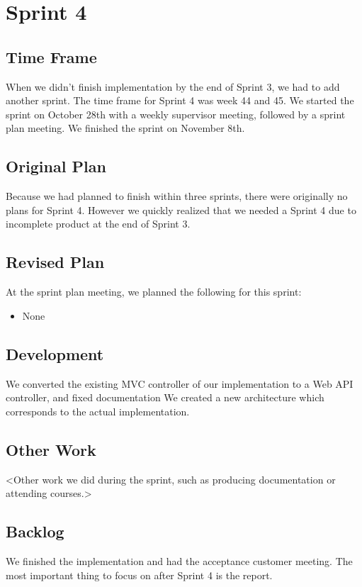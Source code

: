 \section{Sprint 4}

\subsection{Time Frame}
When we didn't finish implementation by the end of Sprint 3, we had to add another sprint. The time frame for Sprint 4 was week 44 and 45. We started the sprint on October 28th with a weekly supervisor meeting, followed by a sprint plan meeting. We finished the sprint on November 8th.

\subsection{Original Plan}
Because we had planned to finish within three sprints, there were originally no plans for Sprint 4. However we quickly realized that we needed a Sprint 4 due to incomplete product at the end of Sprint 3.

\subsection{Revised Plan}
At the sprint plan meeting, we planned the following for this sprint:
\begin{itemize}
	\item None
\end{itemize}


\subsection{Development}
We converted the existing MVC controller of our implementation to a Web API controller, and fixed documentation
We created a new architecture which corresponds to the actual implementation.

\subsection{Other Work}
<Other work we did during the sprint, such as producing documentation or attending courses.>

\subsection{Backlog}
We finished the implementation and had the acceptance customer meeting.
The most important thing to focus on after Sprint 4 is the report.


